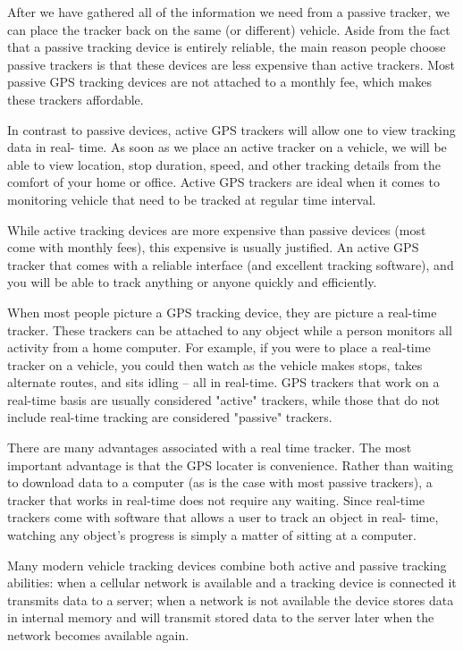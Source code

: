 After we have gathered all of the information we need from a passive tracker, we can place the
tracker back on the same (or different) vehicle. Aside from the fact that a passive tracking device
is entirely reliable, the main reason people choose passive trackers is that these devices are less
expensive than active trackers. Most passive GPS tracking devices are not attached to a monthly
fee, which makes these trackers affordable.

In contrast to passive devices, active GPS trackers will allow one to view tracking data in real-
time. As soon as we place an active tracker on a vehicle, we will be able to view location, stop
duration, speed, and other tracking details from the comfort of your home or office. Active GPS
trackers are ideal when it comes to monitoring vehicle that need to be tracked at regular time
interval.

While active tracking devices are more expensive than passive devices (most come with monthly
fees), this expensive is usually justified. An active GPS tracker that comes with a reliable
interface (and excellent tracking software), and you will be able to track anything or anyone
quickly and efficiently.

When most people picture a GPS tracking device, they are picture a real-time tracker. These
trackers can be attached to any object while a person monitors all activity from a home
computer. For example, if you were to place a real-time tracker on a vehicle, you could then
watch as the vehicle makes stops, takes alternate routes, and sits idling – all in real-time. GPS
trackers that work on a real-time basis are usually considered "active" trackers, while those that
do not include real-time tracking are considered "passive" trackers.

There are many advantages associated with a real time tracker. The most important advantage is
that the GPS locater is convenience. Rather than waiting to download data to a computer (as is
the case with most passive trackers), a tracker that works in real-time does not require any
waiting. Since real-time trackers come with software that allows a user to track an object in real-
time, watching any object's progress is simply a matter of sitting at a computer.

Many modern vehicle tracking devices combine both active and passive tracking abilities: when
a cellular network is available and a tracking device is connected it transmits data to a server;
when a network is not available the device stores data in internal memory and will transmit
stored data to the server later when the network becomes available again.

